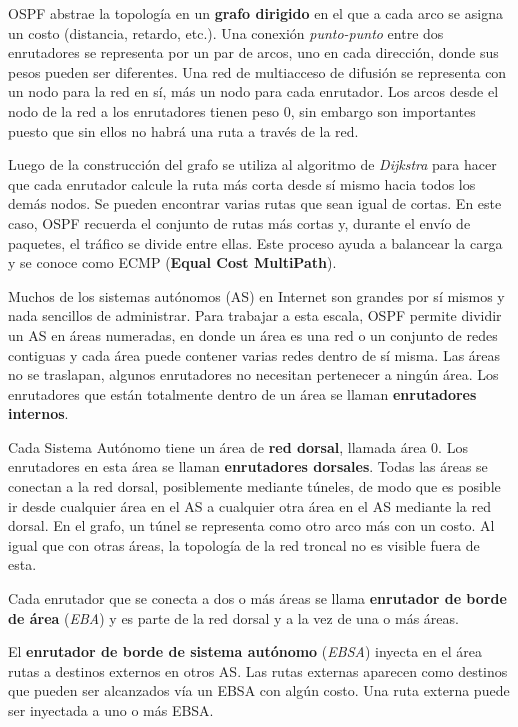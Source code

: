 \documentclass[10pt,a4paper]{report}
\begin{document}
	\par OSPF abstrae la topología en un \textbf{grafo dirigido} en el que a cada arco se asigna un costo (distancia, retardo, etc.). Una conexión \textit{punto-punto} entre dos enrutadores se representa por un par de arcos, uno en cada dirección, donde sus pesos pueden ser diferentes. Una red de multiacceso de difusión se representa con un nodo
para la red en sí, más un nodo para cada enrutador. Los arcos desde el nodo de la red a los enrutadores tienen peso 0, sin embargo son importantes puesto que sin ellos no habrá una ruta a través de la red.

	\par Luego de la construcción del grafo se utiliza al algoritmo de \textit{Dijkstra} para hacer que cada enrutador calcule la ruta más corta desde sí mismo hacia todos los demás nodos. Se pueden encontrar varias rutas que sean igual de cortas. En este caso, OSPF recuerda el conjunto de rutas más cortas y, durante el envío de paquetes, el tráfico se divide entre ellas. Este proceso ayuda a balancear la carga y se conoce como ECMP (\textbf{Equal Cost MultiPath}).

	\par Muchos de los sistemas autónomos (AS) en Internet son grandes por sí mismos y nada sencillos de administrar. Para trabajar a esta escala, OSPF permite dividir un AS en áreas numeradas, en donde un área es una red o un conjunto de redes contiguas y cada área puede contener varias redes dentro de sí misma. Las áreas no se traslapan, algunos enrutadores no necesitan pertenecer a ningún área. Los enrutadores que están totalmente dentro de un área se llaman \textbf{enrutadores internos}.

	\par Cada Sistema Autónomo tiene un área de \textbf{red dorsal}, llamada área 0. Los enrutadores en esta área se llaman \textbf{enrutadores dorsales}. Todas las áreas se conectan a la red dorsal, posiblemente mediante túneles, de modo que es posible ir desde cualquier área en el AS a cualquier otra área en el AS mediante la red dorsal. En el grafo, un túnel se representa como otro arco más con un costo. Al igual que con otras áreas, la topología de la red troncal no es visible fuera de esta.

	\par Cada enrutador que se conecta a dos o más áreas se llama \textbf{enrutador de borde de área} (\textit{EBA}) y es parte de la red dorsal y a la vez de una o más áreas.

	\par El \textbf{enrutador de borde de sistema autónomo} (\textit{EBSA}) inyecta en el área rutas a destinos externos en otros AS. Las rutas externas aparecen como destinos que pueden ser alcanzados vía un EBSA con algún costo. Una ruta externa puede ser inyectada a uno o más EBSA.
\end{document}

